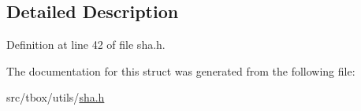 \subsection{Detailed Description}


Definition at line 42 of file sha.\-h.



The documentation for this struct was generated from the following file\-:\begin{DoxyCompactItemize}
\item 
src/tbox/utils/\hyperlink{sha_8h}{sha.\-h}\end{DoxyCompactItemize}
